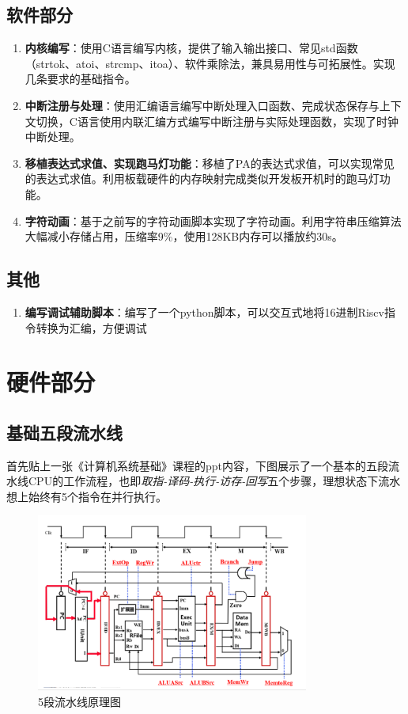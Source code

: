 \documentclass[]{article}
\begin{document}
  \subsection{软件部分}
  \begin{enumerate}
      \item \textbf{内核编写}：使用C语言编写内核，提供了输入输出接口、常见std函数（strtok、atoi、strcmp、itoa）、软件乘除法，兼具易用性与可拓展性。实现几条要求的基础指令。
      \item \textbf{中断注册与处理}：使用汇编语言编写中断处理入口函数、完成状态保存与上下文切换，C语言使用内联汇编方式编写中断注册与实际处理函数，实现了时钟中断处理。
      \item \textbf{移植表达式求值、实现跑马灯功能}：移植了PA的表达式求值，可以实现常见的表达式求值。利用板载硬件的内存映射完成类似开发板开机时的跑马灯功能。
      \item \textbf{字符动画}：基于之前写的字符动画脚本实现了字符动画。利用字符串压缩算法大幅减小存储占用，压缩率9\%，使用128KB内存可以播放约30s。
  \end{enumerate}
  \subsection{其他}
  \begin{enumerate}
      \item \textbf{编写调试辅助脚本}：编写了一个python脚本，可以交互式地将16进制Riscv指令转换为汇编，方便调试
  \end{enumerate}
  
  
  \section{硬件部分}
  \subsection{基础五段流水线}
  首先贴上一张《计算机系统基础》课程的ppt内容，下图展示了一个基本的五段流水线CPU的工作流程，也即\textit{取指-译码-执行-访存-回写}五个步骤，理想状态下流水想上始终有5个指令在并行执行。
  \begin{figure}[htb]
      \centering
      \includegraphics[width=0.8\textwidth]{pipeline.png}
      \caption{5段流水线原理图}
      \label{fig:pipeline}
  \end{figure}
  
\end{document}
